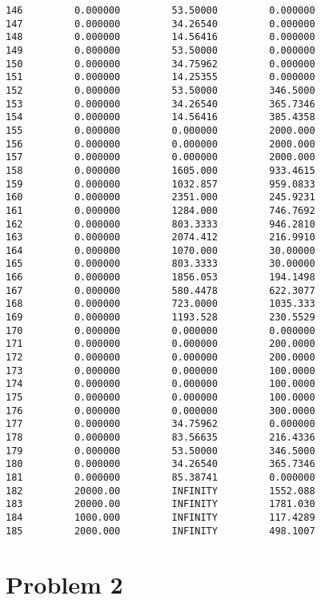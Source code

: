 \documentclass[12pt]{article}
\begin{document}
\begin{appendices}
\begin{lstlisting}
146         0.000000         53.50000         0.000000
147         0.000000         34.26540         0.000000
148         0.000000         14.56416         0.000000
149         0.000000         53.50000         0.000000
150         0.000000         34.75962         0.000000
151         0.000000         14.25355         0.000000
152         0.000000         53.50000         346.5000
153         0.000000         34.26540         365.7346
154         0.000000         14.56416         385.4358
155         0.000000         0.000000         2000.000
156         0.000000         0.000000         2000.000
157         0.000000         0.000000         2000.000
158         0.000000         1605.000         933.4615
159         0.000000         1032.857         959.0833
160         0.000000         2351.000         245.9231
161         0.000000         1284.000         746.7692
162         0.000000         803.3333         946.2810
163         0.000000         2074.412         216.9910
164         0.000000         1070.000         30.00000
165         0.000000         803.3333         30.00000
166         0.000000         1856.053         194.1498
167         0.000000         580.4478         622.3077
168         0.000000         723.0000         1035.333
169         0.000000         1193.528         230.5529
170         0.000000         0.000000         0.000000
171         0.000000         0.000000         200.0000
172         0.000000         0.000000         200.0000
173         0.000000         0.000000         100.0000
174         0.000000         0.000000         100.0000
175         0.000000         0.000000         100.0000
176         0.000000         0.000000         300.0000
177         0.000000         34.75962         0.000000
178         0.000000         83.56635         216.4336
179         0.000000         53.50000         346.5000
180         0.000000         34.26540         365.7346
181         0.000000         85.38741         0.000000
182         20000.00         INFINITY         1552.088
183         20000.00         INFINITY         1781.030
184         1000.000         INFINITY         117.4289
185         2000.000         INFINITY         498.1007
\end{lstlisting}
\section{Problem 2}

\end{appendices}
\end{document}
